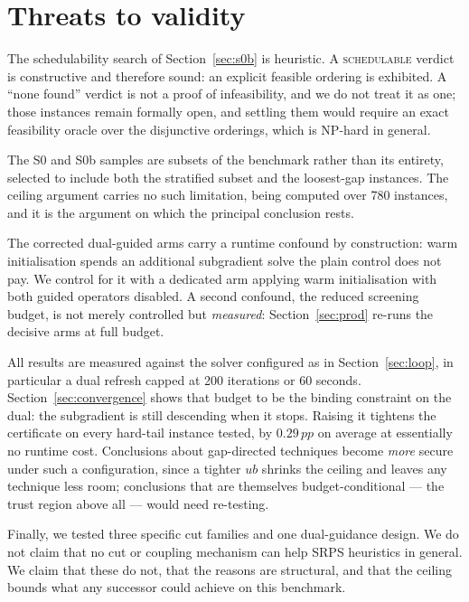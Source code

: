 \documentclass[11pt,a4paper]{article}
\newcommand{\pp}{\,pp}
\begin{document}
\section{Threats to validity}\label{sec:threats}

The schedulability search of Section~\ref{sec:s0b} is heuristic. A
\textsc{schedulable} verdict is constructive and therefore sound: an explicit
feasible ordering is exhibited. A ``none found'' verdict is not a proof of
infeasibility, and we do not treat it as one; those instances remain formally
open, and settling them would require an exact feasibility oracle over the
disjunctive orderings, which is NP-hard in general.

The S0 and S0b samples are subsets of the benchmark rather than its entirety,
selected to include both the stratified subset and the loosest-gap instances. The
ceiling argument carries no such limitation, being computed over 780 instances,
and it is the argument on which the principal conclusion rests.

The corrected dual-guided arms carry a runtime confound by construction: warm
initialisation spends an additional subgradient solve the plain control does not
pay. We control for it with a dedicated arm applying warm initialisation with both
guided operators disabled. A second confound, the reduced screening budget, is not
merely controlled but \emph{measured}: Section~\ref{sec:prod} re-runs the decisive
arms at full budget.

All results are measured against the solver configured as in
Section~\ref{sec:loop}, in particular a dual refresh capped at 200 iterations or
60 seconds. Section~\ref{sec:convergence} shows that budget to be the binding
constraint on the dual: the subgradient is still descending when it stops. Raising
it tightens the certificate on every hard-tail instance tested, by $0.29\pp$ on
average at essentially no runtime cost. Conclusions about gap-directed techniques
become \emph{more} secure under such a configuration, since a tighter $ub$ shrinks
the ceiling and leaves any technique less room; conclusions that are themselves
budget-conditional --- the trust region above all --- would need re-testing.

Finally, we tested three specific cut families and one dual-guidance design. We do
not claim that no cut or coupling mechanism can help SRPS heuristics in general.
We claim that these do not, that the reasons are structural, and that the ceiling
bounds what any successor could achieve on this benchmark.
\end{document}
